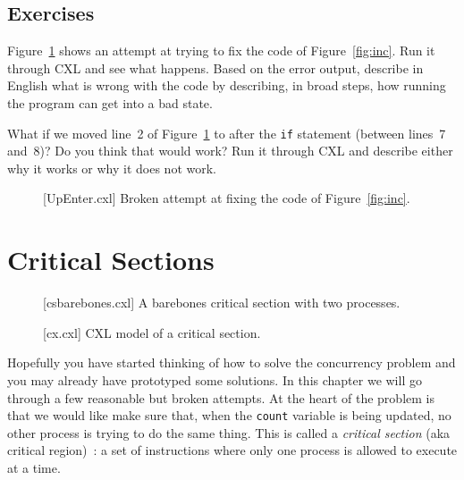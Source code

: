 \documentclass{report}
\newenvironment{code}{
\tcolorbox
}{
\endtcolorbox
}
\begin{document}
\section*{Exercises}

\begin{problems}
\item Figure~\ref{fig:incenter} shows an attempt at trying to fix the code of
    Figure~\ref{fig:inc}.  Run it through CXL and see what happens.  Based on
    the error output, describe in English what is wrong with the code by describing,
    in broad steps, how running the program can get into a bad state.
\item What if we moved line~2 of Figure~\ref{fig:incenter} to after the \texttt{if}
    statement (between lines~7 and~8)?  Do you think that would work?  Run it through
    CXL and describe either why it works or why it does not work.
\end{problems}

\begin{figure}
\begin{code}
\end{code}
\caption{[UpEnter.cxl] Broken attempt at fixing the code of Figure~\ref{fig:inc}.}
\label{fig:incenter}
\end{figure}

\chapter{Critical Sections}
\label{ch:critical}

\begin{figure}
\begin{code}
\end{code}
\caption{[csbarebones.cxl] A barebones critical section with two processes.}
\label{fig:csbarebones}
\end{figure}

\begin{figure}
\begin{code}
\end{code}
\caption{[cx.cxl] CXL model of a critical section.}
\label{fig:cs}
\end{figure}

Hopefully you have started thinking of how to solve the concurrency
problem and you may already have prototyped some solutions.
In this chapter we will go through a few reasonable but broken attempts.
At the heart of the problem is that we would like make sure that, when
the \texttt{count} variable is being updated, no other process is
trying to do the same thing.  This is called a \emph{critical section}
(aka critical region)~\cite{EWD123}:
a set of instructions where only one process is allowed to execute at a
time.
\end{document}
